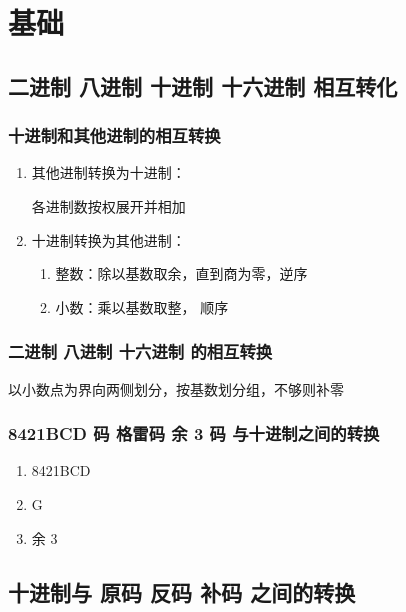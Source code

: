 \chapter{基础}
\newpage

\section{二进制 八进制 十进制 十六进制 相互转化}

\subsection{十进制和其他进制的相互转换}

\begin{enumerate}

\item 其他进制转换为十进制：

各进制数按权展开并相加

\item 十进制转换为其他进制：

\begin{enumerate}

    \item 整数：除以基数取余，直到商为零，逆序
    \item 小数：乘以基数取整， 顺序

\end{enumerate}

\end{enumerate}

\subsection{二进制 八进制 十六进制 的相互转换}

以小数点为界向两侧划分，按基数划分组，不够则补零

\subsection{8421BCD 码 格雷码 余 3 码 与十进制之间的转换}

\begin{enumerate}

    \item 8421BCD
    \item G
    \item 余 3

\end{enumerate}

\section{十进制与 原码 反码 补码 之间的转换}

